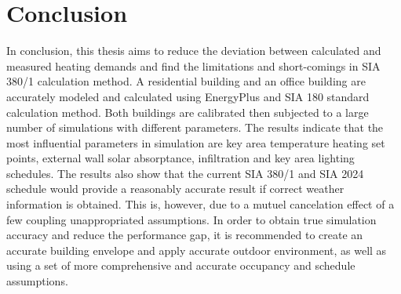 \chapter{Conclusion}
    In conclusion, this thesis aims to reduce the deviation between calculated and measured heating demands and find the limitations and short-comings in SIA 380/1 calculation method. A residential building and an office building are accurately modeled and calculated using EnergyPlus and SIA 180 standard calculation method. Both buildings are calibrated then subjected to a large number of simulations with different parameters. The results indicate that the most influential parameters in simulation are key area temperature heating set points, external wall solar absorptance, infiltration and key area lighting schedules. The results also show that the current SIA 380/1 and SIA 2024 schedule would provide a reasonably accurate result if correct weather information is obtained. This is, however, due to a mutuel cancelation effect of a few coupling unappropriated assumptions. In order to obtain true simulation accuracy and reduce the performance gap, it is recommended to create an accurate building envelope and apply accurate outdoor environment, as well as using a set of more comprehensive and accurate occupancy and schedule assumptions.
